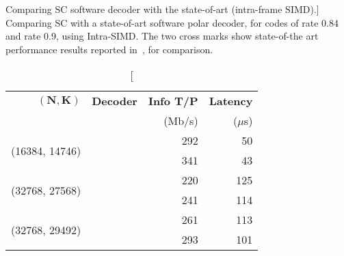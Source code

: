 \begin{table}[htp]
  \centering
  \caption
    [Comparing SC software decoder with the state-of-art (intra-frame SIMD).]
    {Comparing SC with a state-of-art software polar decoder, for codes of
    rate 0.84 and rate 0.9, using Intra-SIMD. The two cross marks show
    state-of-the art performance results reported in~\cite{Sarkis2014}, for
    comparison.}
  \label{tab:eval_polar_sc_gen_thr_comparison}
  \begin{tabular}{r  r  r  r}
    $\bm{(N, K)}$                   & \textbf{Decoder}     & \textbf{Info T/P} & \textbf{Latency} \\
                                    &                      &            (Mb/s) &         ($\mu$s) \\
    \hline
    \hline
    \multirow{2}{*}{(16384, 14746)} & \cite{Sarkis2014}    & 292                      & 50              \\
                                    & \cite{Cassagne2015c} & 341                      & 43              \\
    \hline
    \multirow{2}{*}{(32768, 27568)} & \cite{Sarkis2014}    & 220                      & 125             \\
                                    & \cite{Cassagne2015c} & 241                      & 114             \\
    \hline
    \multirow{2}{*}{(32768, 29492)} & \cite{Sarkis2014}    & 261                      & 113             \\
                                    & \cite{Cassagne2015c} & 293                      & 101             \\
  \end{tabular}
\end{table}

